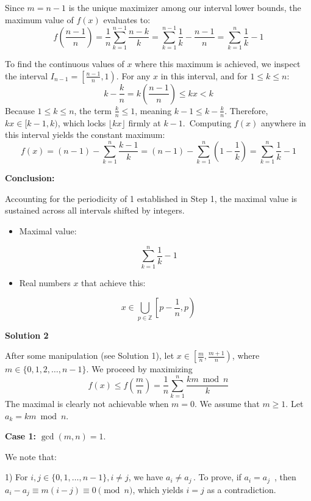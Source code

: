 \begin{enumerate}
 Since $m = n-1$ is the unique maximizer among our interval lower bounds, the maximum value of $f(x)$ evaluates to:
 \[f\left(\frac{n-1}{n}\right) = \frac{1}{n} \sum_{k=1}^{n-1} \frac{n-k}{k} = \sum_{k=1}^{n-1} \frac{1}{k} - \frac{n-1}{n} = \sum_{k=1}^n \frac{1}{k} - 1\]

 To find the continuous values of $x$ where this maximum is achieved, we inspect the interval $I_{n-1} = \left[\frac{n-1}{n}, 1\right)$. For any $x$ in this interval, and for $1 \le k \le n$:
 \[k - \frac{k}{n} = k \left(\frac{n-1}{n}\right) \le kx < k\]Because $1 \le k \le n$, the term $\frac{k}{n} \le 1$, meaning $k-1 \le k - \frac{k}{n}$. Therefore, $kx \in [k-1, k)$, which locks $\lfloor kx \rfloor$ firmly at $k-1$. Computing $f(x)$ anywhere in this interval yields the constant maximum:
 \[f(x) = (n-1) - \sum_{k=1}^n \frac{k-1}{k} = (n-1) - \sum_{k=1}^n \left(1 - \frac{1}{k}\right) = \sum_{k=1}^n \frac{1}{k} - 1\]

 \textbf{Conclusion:}

 Accounting for the periodicity of 1 established in Step 1, the maximal value is sustained across all intervals shifted by integers.

 
            \begin{itemize}
        \item Maximal value:
            \end{itemize}
            
 \[\sum_{k=1}^n \frac{1}{k} - 1\]

            \begin{itemize}
        \item Real numbers $x$ that achieve this: 
            \end{itemize}
            
 \[x \in \bigcup_{p \in \mathbb{Z}} \left[p - \frac{1}{n}, p\right)\]




\textbf{Solution 2}

After some manipulation (see Solution 1), let $x\in \left[\frac{m}{n}, \frac{m+1}{n}\right)$, where $m\in\{0,1,2,\ldots, n-1\}$. We proceed by maximizing
 \[f(x)\le f\left(\frac{m}{n}\right)=\frac{1}{n}\sum_{k=1}^{n}\frac{km\bmod{n}}{k}\]The maximal is clearly not achievable when $m=0$. We assume that $m\ge 1$. Let $a_k=km\bmod n$.

 \textbf{Case 1: }$\gcd(m,n)=1$. 

 We note that:

 1) For $i,j\in\{0,1,\ldots,n-1\}, i\neq j$, we have $a_i\neq a_j \,$. To prove, if $a_i=a_j\,$ , then $a_i-a_j\equiv m(i-j)\equiv 0\pmod{n}$, which yields $i=j$ as a contradiction.


\end{enumerate}
